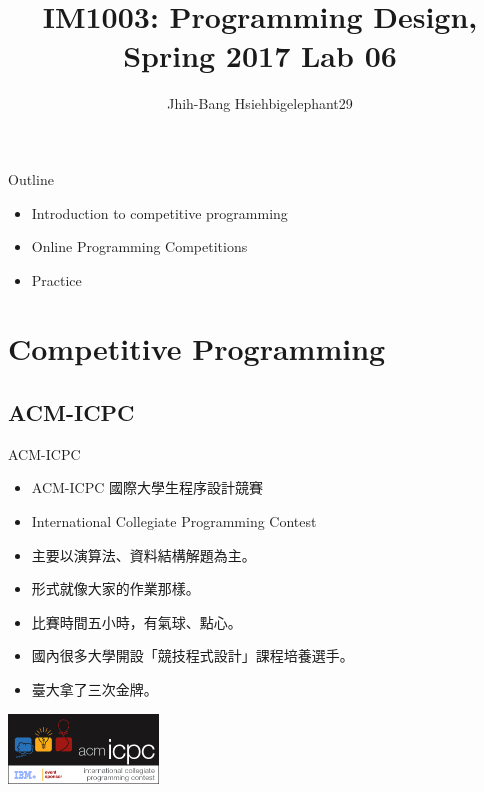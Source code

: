 \documentclass[t]{beamer}
\title{IM1003: Programming Design, Spring 2017  \linebreak Lab 06}
\author[bigelephant29]{Jhih-Bang Hsieh\linebreak \small{bigelephant29}}
\institute{\textbf{National Taiwan University}}
\date{}
\begin{document}
\begin{frame}
  \maketitle
\end{frame}

\begin{frame}{Outline}
  \begin{itemize}
    \item Introduction to competitive programming
    \item Online Programming Competitions
    \item Practice
  \end{itemize}
\end{frame}

\section{Competitive Programming}
\subsection{ACM-ICPC}
\begin{frame}{ACM-ICPC}
  \begin{itemize}
    \item ACM-ICPC 國際大學生程序設計競賽
    \item International Collegiate Programming Contest
    \item 主要以演算法、資料結構解題為主。
    \item 形式就像大家的作業那樣。
    \item 比賽時間五小時，有氣球、點心。
    \item 國內很多大學開設「競技程式設計」課程培養選手。
    \item 臺大拿了三次金牌。
  \end{itemize}  
  \begin{center}
    \includegraphics[height=5em]{image/icpc.png}
  \end{center}
\end{frame}
\end{document}
